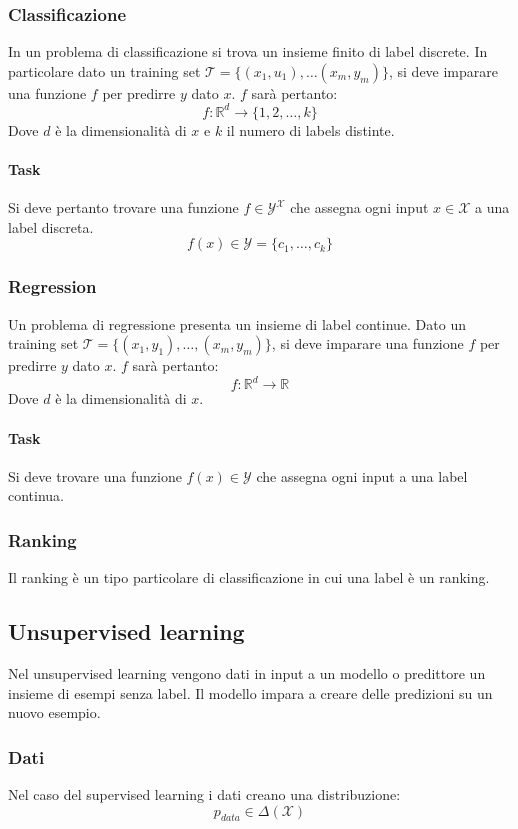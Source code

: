 		\subsubsection{Classificazione}
		In un problema di classificazione si trova un insieme finito di label discrete.
		In particolare dato un training set $\mathcal{T} = \{(x_1, u_1),\dots(x_m, y_m)\}$, si deve imparare una funzione $f$ per predirre $y$ dato $x$.
		$f$ sar\`a pertanto:
		$$f:\mathbb{R}^d \rightarrow\{1, 2, \dots, k\}$$
		Dove $d$ \`e la dimensionalit\`a di $x$ e $k$ il numero di labels distinte.

			\paragraph{Task}
			Si deve pertanto trovare una funzione $f\in\mathcal{Y^X}$ che assegna ogni input $x\in\mathcal{X}$ a una label discreta.
			$$f(x)\in\mathcal{Y}=\{c_1,\dots,c_k\}$$

		\subsubsection{Regression}
		Un problema di regressione presenta un insieme di label continue.
		Dato un training set $\mathcal{T}=\{(x_1, y_1),\dots,(x_m,y_m)\}$, si deve imparare una funzione $f$ per predirre $y$ dato $x$.
		$f$ sar\`a pertanto:
		$$f:\mathbb{R}^d\rightarrow\mathbb{R}$$
		Dove $d$ \`e la dimensionalit\`a di $x$.

			\paragraph{Task}
			Si deve trovare una funzione $f(x)\in\mathcal{Y}$ che assegna ogni input a una label continua.

		\subsubsection{Ranking}
		Il ranking \`e un tipo particolare di classificazione in cui una label \`e un ranking.

	\subsection{Unsupervised learning}
	Nel unsupervised learning vengono dati in input a un modello o predittore un insieme di esempi senza label.
	Il modello impara a creare delle predizioni su un nuovo esempio.

		\subsubsection{Dati}
		Nel caso del supervised learning i dati creano una distribuzione:
		$$p_{data}\in\Delta(\mathcal{X})$$

